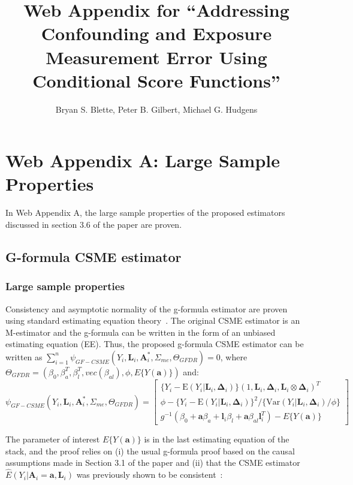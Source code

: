 \documentclass[12pt]{article}
\title{Web Appendix for ``Addressing Confounding and Exposure Measurement Error Using Conditional Score Functions''}
\author{Bryan S. Blette, Peter B. Gilbert, Michael G. Hudgens}
\date{}
\begin{document}


\maketitle

\section{Web Appendix A: Large Sample Properties}

In Web Appendix A, the large sample properties of the proposed estimators discussed in section 3.6 of the paper are proven.

\subsection{G-formula CSME estimator}

\subsubsection{Large sample properties}

Consistency and asymptotic normality of the g-formula estimator are proven using standard estimating equation theory~\citep{stefanski2002}. The original CSME estimator is an M-estimator and the g-formula can be written in the form of an unbiased estimating equation (EE). Thus, the proposed g-formula CSME estimator can be written as $\sum_{i=1}^{n} \psi_{GF-CSME}(Y_{i}, \bm{L}_{i}, \bm{A}^{*}_{i}, \Sigma_{me}, \Theta_{GFDR}) = 0$, where $\Theta_{GFDR} = (\beta_{0}, \beta^{T}_{a}, \beta^{T}_{l}, vec(\beta_{al}), \phi, E \{ Y(\bm{a}) \})$ and:
\begin{equation*}
    \psi_{GF-CSME}(Y_{i}, \bm{L}_{i}, \bm{A}^{*}_{i}, \Sigma_{me}, \Theta_{GFDR}) =
    \begin{bmatrix}
       \{ Y_{i} - \text{E}(Y_{i} | \bm{L}_{i}, \bm{\Delta}_{i}) \} (1, \bm{L}_{i}, \bm{\Delta}_{i}, \bm{L}_{i} \otimes \bm{\Delta}_{i})^{T} \\
        \phi - \{ Y_{i} - \text{E}(Y_{i} | \bm{L}_{i}, \bm{\Delta}_{i}) \}^{2} / \{ \text{Var}(Y_{i} | \bm{L}_{i}, \bm{\Delta}_{i}) / \phi \} \\
        g^{-1}(\beta_{0} + \bm{a}\beta_{a} + \bm{l}_{i}\beta_{l} +
        \bm{a}\beta_{al}\bm{l}_{i}^{T}) - E \{ Y(\bm{a}) \}
    \end{bmatrix}
\end{equation*}

The parameter of interest $E \{ Y(\bm{a}) \}$ is in the last estimating equation of the stack, and the proof relies on (i) the usual g-formula proof based on the causal assumptions made in Section 3.1 of the paper and (ii) that the CSME estimator $\hat{E}(Y_{i} | \bm{A}_{i} = \bm{a}, \bm{L}_{i})$ was previously shown to be consistent~\citep{carroll2006}:
\end{document}
